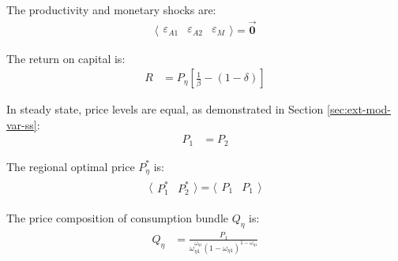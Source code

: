 \documentclass[../thesis.tex]{subfiles}
\begin{document}
	The productivity and monetary shocks are:
	\begin{align}
		\langle \begin{matrix} \varepsilon_{A1} & \varepsilon_{A2} & \varepsilon_{M} \end{matrix} \rangle = \vec{\bm{0}} \label{eq_v2:reg-ss-epsilon}
	\end{align}

	
	The return on capital is:
	\begin{align}
		R &= P_{\eta} \left[ \frac{1}{\beta} - (1- \delta) \right] \label{eq_v2:reg-ss-return-on-capital}
	\end{align}

In steady state, price levels are equal, as demonstrated in Section \ref{sec:ext-mod-var-ss}:
\begin{align}
	P_{1} &= P_{2} \label{eq_v2:reg-ss-pn}
\end{align}


The regional optimal price $P_{\eta}^{\ast}$ is:
\begin{align}
	\langle \begin{matrix} P_{1}^{\ast} & P_{2}^{\ast} \end{matrix} \rangle = \langle \begin{matrix} P_{1} & P_{1} \end{matrix} \rangle \label{eq_v2:reg-ss-p1-p2}
\end{align}

\begin{comment}

Substitute \ref{eq_v2:reg-ss-p1-p2} and \ref{eq_v2:reg-ss-market-clearing-condition-Yt} in \ref{eq_v2:reg-ss-national-price-level} for the national price level:
\begin{align}
	P_{} &= \frac{P_{1} Y_{1} + P_{2} Y_{2}}{Y_{}} \tag{\ref{eq_v2:reg-ss-national-price-level}} \implies \nonumber \\
	P_{} &= \frac{P_{1} Y_{1} + \theta_{P} P_{1} Y_{2}}{Y_{}} \label{eq_v2:reg-ss-p1-p2-p}
\end{align}
	
\end{comment}

The price composition of consumption bundle $Q_{\eta}$ is:
\begin{align}
	Q_{\eta} &= \frac{ P_{1} }{\omega_{\eta 1}^{\omega_{\eta 1}} (1 - \omega_{\eta 1})^{1 - \omega_{\eta 1}}} \label{eq_v2:reg-ss-q1}
\end{align}
\end{document}
